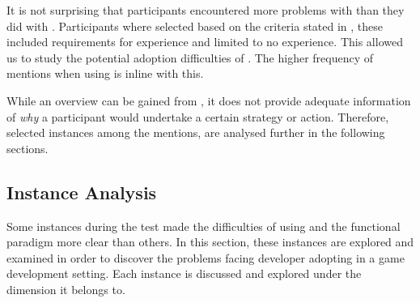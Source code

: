 It is not surprising that participants encountered more problems with \fs than they did with \cs. Participants where selected based on the criteria stated in , these included requirements for \cs experience and limited to no  \fs experience. This allowed us to study the potential adoption difficulties of \fs. The higher frequency of mentions when using \fs is inline with this.

While an overview can be gained from , it does not provide adequate information of \textit{why} a participant would undertake a certain strategy or action. Therefore, selected instances among the mentions, are analysed further in the following sections.

\subsection{Instance Analysis}
Some instances during the test made the difficulties of using \fs and the functional paradigm more clear than others. In this section, these instances are explored and examined in order to discover the problems facing developer adopting \fs in a game development setting. Each instance is discussed and explored under the dimension it belongs to.




